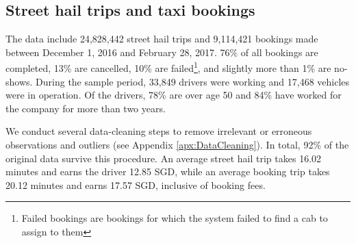 \documentclass[reviewmode,AEJ]{AEA}
\begin{document}
\subsection{Street hail trips and taxi bookings}
The data include 24,828,442 street hail trips and 9,114,421 bookings made between December 1, 2016 and
February 28, 2017. 76\% of all bookings are 
completed, 13\% are cancelled, 10\% are failed\footnote{Failed bookings are bookings for which the system failed to find a cab to assign to them}, and slightly more than 1\% are no-shows.
During the sample period, 33,849 drivers were working and 17,468 vehicles were in operation.
Of the drivers, %
78\% are over age 50 and 84\% have worked for the company for more than two years.

We conduct several data-cleaning steps to remove irrelevant or erroneous observations and outliers (see Appendix \ref{apx:DataCleaning}).
In total, 92\% of the original data survive this procedure. %
An average street hail trip takes 16.02 minutes and earns the driver 12.85 SGD, while an average  
booking trip takes 20.12 minutes and earns 17.57 SGD, inclusive of booking fees.
\end{document}
